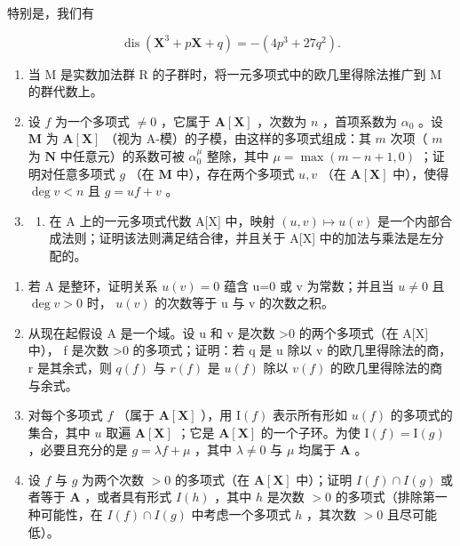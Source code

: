 特别是，我们有

\[
\operatorname{dis} \left(\mathbf {X} ^ {3} + p \mathbf {X} + q\right) = - \left(4 p ^ {3} + 2 7 q ^ {2}\right).
\]

\BourbakiExercises

\BourbakiExerciseGroup

\begin{enumerate}
\def\labelenumi{\arabic{enumi})}
\item
  当 M 是实数加法群 R 的子群时，将一元多项式中的欧几里得除法推广到 M 的群代数上。
\item
  设 \(f\) 为一个多项式 \(\neq 0\) ，它属于 \(\mathbf{A}[\mathbf{X}]\) ，次数为 \(n\) ，首项系数为 \(\alpha_0\) 。设 \(\mathbf{M}\) 为 \(\mathbf{A}[\mathbf{X}]\) （视为 A-模）的子模，由这样的多项式组成：其 \(m\) 次项（ \(m\) 为 \(\mathbf{N}\) 中任意元）的系数可被 \(\alpha_0^\mu\) 整除，其中 \(\mu = \max(m - n + 1, 0)\) ；证明对任意多项式 \(g\) （在 \(\mathbf{M}\) 中），存在两个多项式 \(u, v\) （在 \(\mathbf{A}[\mathbf{X}]\) 中），使得 \(\deg v < n\) 且 \(g = uf + v\) 。
\item
  \begin{enumerate}
  \def\labelenumii{\alph{enumii})}
  \tightlist
  \item
    在 A 上的一元多项式代数 A{[}X{]} 中，映射 \((u,v)\mapsto u(v)\) 是一个内部合成法则；证明该法则满足结合律，并且关于 A{[}X{]} 中的加法与乘法是左分配的。
  \end{enumerate}
\end{enumerate}

\begin{enumerate}
\def\labelenumi{\alph{enumi})}
\setcounter{enumi}{1}
\item
  若 A 是整环，证明关系 \(u(v)=0\) 蕴含 u=0 或 v 为常数；并且当 \(u\neq0\) 且 \(\deg v>0\) 时， \(u(v)\) 的次数等于 u 与 v 的次数之积。
\item
  从现在起假设 A 是一个域。设 u 和 v 是次数 \textgreater0 的两个多项式（在 A{[}X{]} 中）， f 是次数 \textgreater0 的多项式；证明：若 q 是 u 除以 v 的欧几里得除法的商， r 是其余式，则 \(q(f)\) 与 \(r(f)\) 是 \(u(f)\) 除以 \(v(f)\) 的欧几里得除法的商与余式。
\item
  对每个多项式 \(f\) （属于 \(\mathbf{A}[\mathbf{X}]\) ），用 \(\mathrm{I}(f)\) 表示所有形如 \(u(f)\) 的多项式的集合，其中 \(u\) 取遍 \(\mathbf{A}[\mathbf{X}]\) ；它是 \(\mathbf{A}[\mathbf{X}]\) 的一个子环。为使 \(\mathrm{I}(f) = \mathrm{I}(g)\) ，必要且充分的是 \(g = \lambda f + \mu\) ，其中 \(\lambda \neq 0\) 与 \(\mu\) 均属于 \(\mathbf{A}\) 。
\item
  设 \(f\) 与 \(g\) 为两个次数 \(> 0\) 的多项式（在 \(\mathbf{A}[\mathbf{X}]\) 中）；证明 \(I(f) \cap I(g)\) 或者等于 \(\mathbf{A}\) ，或者具有形式 \(I(h)\) ，其中 \(h\) 是次数 \(> 0\) 的多项式（排除第一种可能性，在 \(I(f) \cap I(g)\) 中考虑一个多项式 \(h\) ，其次数 \(> 0\) 且尽可能低）。
\end{enumerate}

